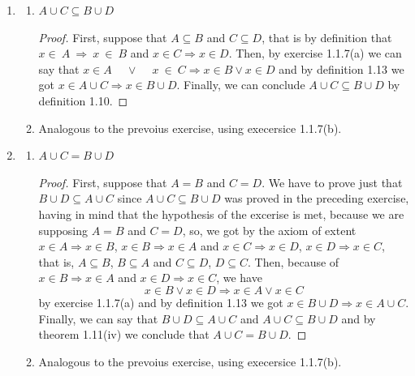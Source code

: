 \documentclass{article}
\begin{document}
		 \begin{enumerate}
		 	\item[1.] \begin{enumerate}
		 		\item[a)] $A \cup C \subseteq B \cup D$
		 		
		 		\begin{proof}
		 		First, suppose that $A \subseteq B$ and $C \subseteq D$, that is by definition that $x \in~A~\Rightarrow~x~\in~B$ and $x \in C \Rightarrow x \in D$. Then, by exercise 1.1.7(a) we can say that $x \in A~\quad\lor \quad~x~\in~C \Rightarrow x \in B \lor x \in D$ and by definition 1.13 we got $x \in A \cup C \Rightarrow x \in B \cup D$. Finally, we can conclude $A \cup C \subseteq B \cup D$ by definition 1.10.  
		 		\end{proof}
		 		
		 		\item[b)] Analogous to the prevoius exercise, using execersice 1.1.7(b).
		 	\end{enumerate}
		 	
		 	\item[2.] \begin{enumerate}
		 		\item[a)] $A \cup C = B \cup D$
		 		
		 		\begin{proof}
		 			First, suppose that $A = B$ and $C = D$. We have to prove just that $B \cup D \subseteq A \cup C$ since $A \cup C \subseteq B \cup D$ was proved in the preceding exercise, having in mind that the hypothesis of the excerise is met, because we are supposing $A = B$ and $C = D$, so, we got by the axiom of extent $x \in A \Rightarrow x \in B$, $x \in B \Rightarrow x \in A$ and $x \in C \Rightarrow x \in D$, $x \in D \Rightarrow x \in C$, that is, $A \subseteq B$, $B \subseteq A$ and $C \subseteq D$, $D \subseteq C$. Then, because of $x \in B \Rightarrow x \in A$ and $x \in D \Rightarrow x \in C$, we have 
		 			\[
		 			x \in B \lor x \in D \Rightarrow x \in A \lor x \in C
		 			\]
		 			by exercise 1.1.7(a) and by definition 1.13 we got $x \in B \cup D \Rightarrow x \in A \cup C$. Finally, we can say that $B \cup D \subseteq A \cup C$ and $A \cup C \subseteq B \cup D$ and by theorem 1.11(iv) we conclude that $A \cup C = B \cup D$.
		 		\end{proof}
		 		
		 		\item[b)] Analogous to the prevoius exercise, using execersice 1.1.7(b).
		 	\end{enumerate}
		 	

\end{enumerate}
\end{document}
